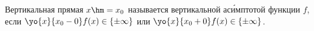 
  Вертикальная прямая $x\hm=x_0$ называется вертикальной ас\'{и}мптотой функции $f$, если $\yo{x}{x_0-0} f(x)\in\{\pm\infty\}$ или $\yo{x}{x_0+0}f(x)\in\{\pm\infty\}$.
